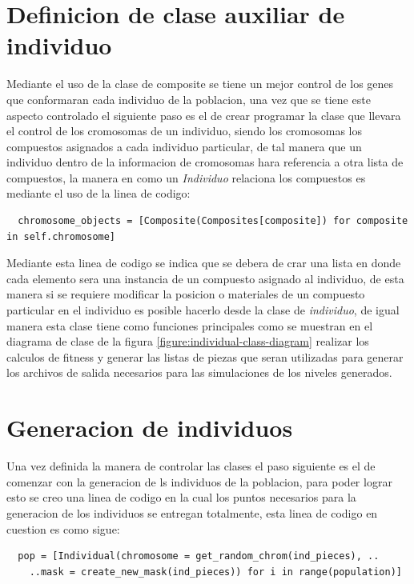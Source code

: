 \section{Definicion de clase auxiliar de individuo}
\label{section:definition_of_clases}

Mediante el uso de la clase de composite se tiene un mejor control de los genes
que conformaran cada individuo de la poblacion, una vez que se tiene este
aspecto controlado el siguiente paso es el de crear programar la clase que
llevara el control de los cromosomas de un individuo, siendo los cromosomas los
compuestos asignados a cada individuo particular, de tal manera que un individuo
dentro de la informacion de cromosomas hara referencia a otra lista de
compuestos, la manera en como un \textit{Individuo} relaciona los compuestos es
mediante el uso de la linea de codigo:

\begin{verbatim}
  chromosome_objects = [Composite(Composites[composite]) for composite in self.chromosome]
\end{verbatim}

Mediante esta linea de codigo se indica que se debera de crar una lista en donde
cada elemento sera una instancia de un compuesto asignado al individuo, de esta
manera si se requiere modificar la posicion o materiales de un compuesto
particular en el individuo es posible hacerlo desde la clase de
\textit{individuo}, de igual manera esta clase tiene como funciones principales
como se muestran en el diagrama de clase de la figura
\ref{figure:individual-class-diagram} realizar los calculos de fitness y generar
las listas de piezas que seran utilizadas para generar los archivos de salida
necesarios para las simulaciones de los niveles generados.



\section{Generacion de individuos}
\label{section:ind_generation}

Una vez definida la manera de controlar las clases el paso siguiente es el de
comenzar con la generacion de ls individuos de la poblacion, para poder lograr
esto se creo una linea de codigo en la cual los puntos necesarios para la
generacion de los individuos se entregan totalmente, esta linea de codigo en
cuestion es como sigue: 

\begin{verbatim}
  pop = [Individual(chromosome = get_random_chrom(ind_pieces), ..
    ..mask = create_new_mask(ind_pieces)) for i in range(population)]
\end{verbatim}

